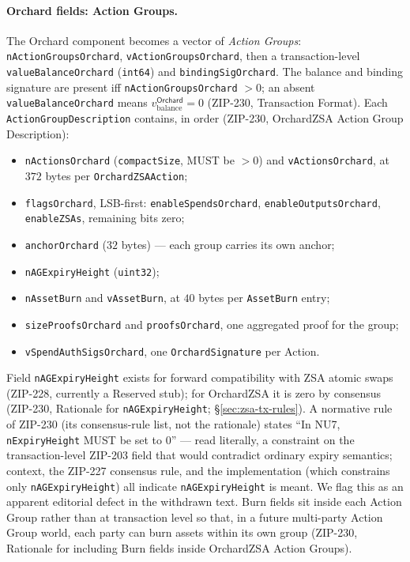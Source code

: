 \documentclass[11pt,a4paper]{article}
\theoremstyle{definition}
\begin{document}
\paragraph{Orchard fields: Action Groups.} The Orchard component becomes a
vector of \emph{Action Groups}: \texttt{nActionGroupsOrchard},
\texttt{vActionGroupsOrchard}, then a transaction-level
\texttt{valueBalanceOrchard} (\texttt{int64}) and
\texttt{bindingSigOrchard}. The balance and binding signature are present iff
\texttt{nActionGroupsOrchard} $> 0$; an absent \texttt{valueBalanceOrchard}
means $v_{\mathrm{balance}}^{\mathsf{Orchard}} = 0$ (ZIP-230, Transaction
Format). Each \texttt{ActionGroupDescription} contains, in order
(ZIP-230, OrchardZSA Action Group Description):
\begin{itemize}[itemsep=1pt]
\item \texttt{nActionsOrchard} (\texttt{compactSize}, MUST be $> 0$) and
  \texttt{vActionsOrchard}, at $372$ bytes per \texttt{OrchardZSAAction};
\item \texttt{flagsOrchard}, LSB-first: \texttt{enableSpendsOrchard},
  \texttt{enableOutputsOrchard}, \texttt{enableZSAs}, remaining bits zero;
\item \texttt{anchorOrchard} ($32$ bytes) --- each group carries its own
  anchor;
\item \texttt{nAGExpiryHeight} (\texttt{uint32});
\item \texttt{nAssetBurn} and \texttt{vAssetBurn}, at $40$ bytes per
  \texttt{AssetBurn} entry;
\item \texttt{sizeProofsOrchard} and \texttt{proofsOrchard}, one aggregated
  proof for the group;
\item \texttt{vSpendAuthSigsOrchard}, one \texttt{OrchardSignature} per
  Action.
\end{itemize}
Field \texttt{nAGExpiryHeight} exists for forward compatibility with ZSA
atomic swaps (ZIP-228, currently a Reserved stub); for OrchardZSA it is zero
by consensus (ZIP-230, Rationale for \texttt{nAGExpiryHeight};
\S\ref{sec:zsa-tx-rules}). A normative rule of ZIP-230 (its consensus-rule
list, not the rationale) states ``In NU7, \texttt{nExpiryHeight} MUST be set
to 0'' --- read literally, a constraint on
the transaction-level ZIP-203 field that would contradict ordinary expiry
semantics; context, the ZIP-227 consensus rule, and the implementation (which
constrains only \texttt{nAGExpiryHeight}) all indicate
\texttt{nAGExpiryHeight} is meant. We flag this as an apparent editorial
defect in the withdrawn text. Burn fields sit inside each Action Group
rather than at transaction level so that, in a future multi-party Action
Group world, each party can burn assets within its own group (ZIP-230,
Rationale for including Burn fields inside OrchardZSA Action Groups).
\end{document}
